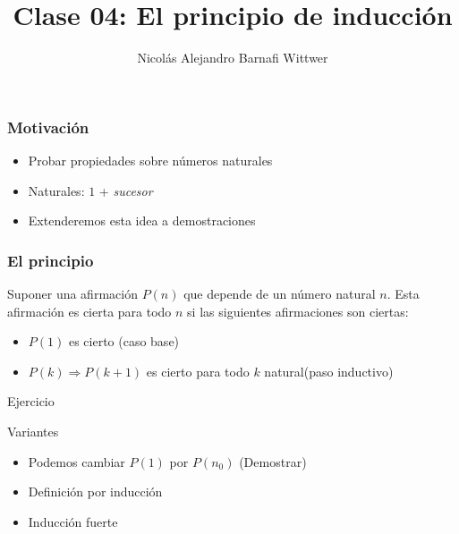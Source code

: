 \documentclass[14pt,aspectratio=169,xcolor=dvipsnames]{beamer}
\title[short title]{Clase 04: El principio de inducción}
\subtitle{}
\author[NA Barnafi] {Nicolás Alejandro Barnafi Wittwer}
\institute[UC|CMM] 
{
    Pontificia Universidad Católica de Chile \\
    Centro de Modelamiento Matemático
}
\date{}
\begin{document}
\begin{frame}
    \maketitle
\end{frame}
\begin{frame}\frametitle{Motivación}
    \begin{itemize}
        \item Probar propiedades sobre números naturales
        \item Naturales: $1$ + \emph{sucesor}
        \item Extenderemos esta idea a demostraciones
    \end{itemize}
\end{frame}
\begin{frame}\frametitle{El principio}
    \begin{block}{}
        Suponer una afirmación $P(n)$ que depende de un número natural $n$. Esta afirmación es cierta para todo $n$ si las siguientes afirmaciones son ciertas:
        \begin{itemize}
            \item $P(1)$ es cierto \hfill \alert{(caso base)}
            \item $P(k) \Rightarrow P(k+1)$ es cierto para todo $k$ natural\hfill \alert{(paso inductivo)}
        \end{itemize}
    \end{block}
    \pause {}
\end{frame}
\begin{frame}{Ejercicio}
    \begin{center}
\end{center}
\end{frame}
\begin{frame}{Variantes}
    \begin{itemize}
        \item Podemos cambiar $P(1)$ por  $P(n_0)$ (Demostrar)
        \item Definición por inducción
        \item Inducción fuerte
    \end{itemize}
\end{frame}
\end{document}
